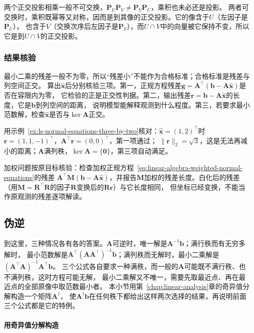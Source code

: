 两个正交投影相乘一般不可交换，$\bm P_U\bm P_V\neq\bm P_V\bm P_U$，乘积也未必还是投影。
两者可交换时，乘积既幂等又对称，因而是到其像的正交投影。它的像含于$U$（左因子是$\bm P_U$），
也含于$V$（交换次序后左因子是$\bm P_V$），而$U\cap V$中的向量被它保持不变，所以它是到$U\cap V$的正交投影。

\subsubsection{结果核验}
\label{sec:ls-least-squares-verification}

最小二乘的残差一般不为零，所以“残差小”不能作为合格标准；合格标准是残差与列空间正交。
算出$\hat{\bm x}$后分别核验三项。第一，正规方程残差$\bm g=\bm A^\top(\bm b-\bm A\hat{\bm x})$是否在容限内为零，
它检验的正是正交性判据。第二，输出残差$\bm r=\bm b-\bm A\hat{\bm x}$的长度，它是$\bm b$到列空间的距离，
说明模型能解释观测到什么程度。第三，若要求最小范数解，检查$\hat{\bm x}$是否与$\ker\bm A$正交。

用示例~\ref{ex:ls-normal-equations-three-by-two}核对：$\hat{\bm x}=(1,2)^\top$时$\bm r=(1,1,-1)^\top$，$\bm A^\top\bm r=(0,0)^\top$，第一项通过；
$\lVert\bm r\rVert_2=\sqrt3$，这是无法再减小的距离；$\bm A$满列秩，$\ker\bm A=\{\bm0\}$，第三项自动满足。

加权问题按原目标核验：检查加权正规方程~\eqref{eq:linear-algebra-weighted-normal-equations}的残差
$\bm A^\top\bm M(\bm b-\bm A\hat{\bm x})$，并报告$\bm M$加权的残差长度。白化后的残差（用$\bm M=\bm R^\top\bm R$的因子$\bm R$变换后的$\bm R\bm r$）与它长度相同，
但坐标已经变换，不能当作原观测的残差逐项解读。

\subsection{伪逆}
\label{sec:ls-pseudoinverse}

到这里，三种情况各有各的答案。$\bm A$可逆时，唯一解是$\bm A^{-1}\bm b$；满行秩而有无穷多解时，
最小范数解是$\bm A^\top(\bm A\bm A^\top)^{-1}\bm b$；满列秩而无解时，最小二乘解是$(\bm A^\top\bm A)^{-1}\bm A^\top\bm b$。
三个公式各自要求一种满秩，而一般的$\bm A$可能既不满行秩、也不满列秩，这时方程可能无解，
最小二乘解又不唯一，需要先取最近点、再在最近点的全部原像中取范数最小者。
本小节用第~\ref{chap:linear-analysis}章的奇异值分解构造一个矩阵$\bm A^\dagger$，
使$\bm A^\dagger\bm b$在任何秩下都给出这样两次选择的结果，再说明前面三个公式都是它的特例。

\paragraph{用奇异值分解构造}

